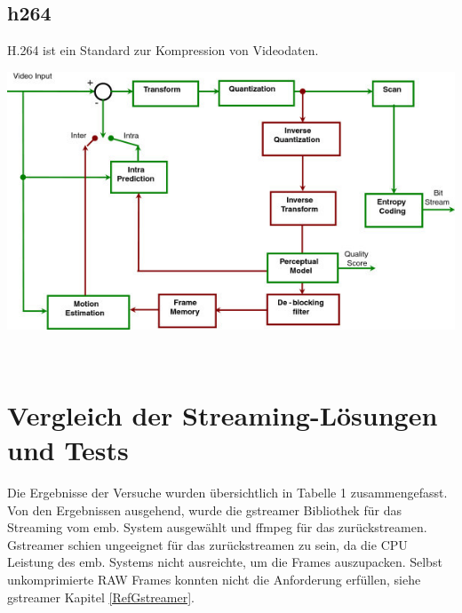 \subsection{h264}
\color{red}
H.264 ist ein Standard zur Kompression von Videodaten.  \\
\color{black}

\begin{minipage}{\textwidth}
    \begin{center}
        \includegraphics[scale=3.0]{img/h264.jpg} 
    \end{center}
\end{minipage}\\


\section{Vergleich der Streaming-Lösungen und Tests} \label{RefVergleich}
Die Ergebnisse der Versuche wurden übersichtlich in Tabelle 1 zusammengefasst. Von den Ergebnissen ausgehend, wurde die gstreamer Bibliothek für das Streaming vom emb. System ausgewählt und ffmpeg für das zurückstreamen. Gstreamer schien ungeeignet für das zurückstreamen zu sein, da die CPU Leistung des emb. Systems nicht ausreichte, um die Frames auszupacken. Selbst unkomprimierte RAW Frames konnten nicht die Anforderung erfüllen, siehe gstreamer Kapitel \ref{RefGstreamer}.

